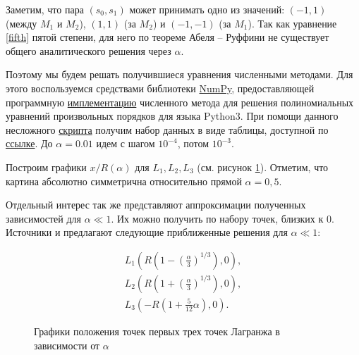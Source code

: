 \documentclass[12pt]{article}
\begin{document}
    \par Заметим, что пара $(s_0, s_1)$ может принимать одно из значений:
    $(-1, 1)$ (между $M_1$ и $M_2$), $(1, 1)$ (за $M_2$) и $(-1, -1)$ (за $M_1$). 
    Так как уравнение \ref{fifth} пятой степени,
    для него по теореме Абеля -- Руффини \cite{alexeev} не существует общего аналитического решения
    через $\alpha$. 

    \par Поэтому мы будем решать получившиеся уравнения численными методами. Для
    этого воспользуемся средствами библиотеки \href{https://numpy.org}{NumPy},
    предоставляющей программную    
    \href{https://numpy.org/doc/stable/reference/generated/numpy.roots.html#r01a8f58ef25b-1}
    {имплементацию}
    численного метода для решения
    полиномиальных уравнений произвольных порядков для языка Python3.
    При помощи данного несложного 
    \href{https://github.com/victorbaldin56/VPV/blob/main/2023/lagrange_solver/lagrange_solver.py}
    {скрипта} получим набор данных в виде таблицы, доступной по
    \href{https://github.com/victorbaldin56/VPV/blob/main/2023/lagrange_solver/lagrange_solver_data.csv}
    {ссылке}. До $\alpha = 0.01$ идем с шагом $10^{-4}$, потом $10^{-3}$.

    \par Построим графики $x/R(\alpha)$ для $L_1, L_2, L_3$ (см. рисунок \ref{sss}). 
    Отметим, что картина абсолютно симметрична относительно прямой $\alpha = 0{,}5$.

    \par Отдельный интерес так же представляют аппроксимации полученных 
    зависимостей для $\alpha \ll 1$. Их можно получить по набору точек, близких к 
    0. Источники \cite{mit2008} и \cite{nasagov} предлагают следующие приближенные решения
    для $\alpha \ll 1$:
    
    \begin{eqnarray}
        L_1\left(R\left(1 - \left(\frac{\alpha}{3}\right)^{1/3}\right), 0\right),\nonumber \\
        L_2\left(R\left(1 + \left(\frac{\alpha}{3}\right)^{1/3}\right), 0\right),\nonumber \\
        L_3\left(-R\left(1 + \frac{5}{12}\alpha\right), 0\right).
        \label{approx}
    \end{eqnarray}
     
    \begin{figure}[H]
        \centering
        
        \caption{Графики положения точек первых трех точек Лагранжа в зависимости от 
        $\alpha$}
        \label{sss}
    \end{figure}
    
\end{document}
